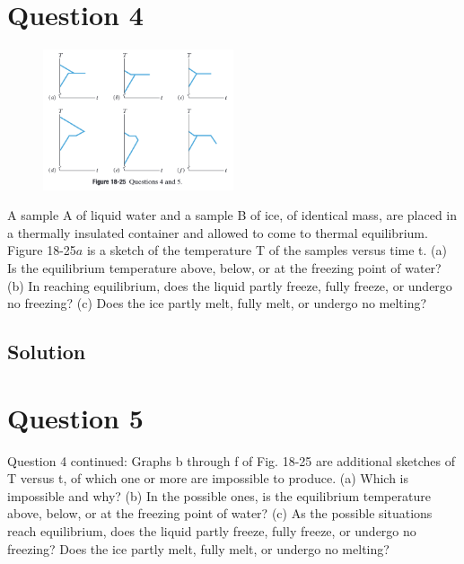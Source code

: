 \documentclass[12pt]{article}
\begin{document}

    \section{Question 4}
        \begin{figure}
            \vspace{-30pt}
            \includegraphics[width=0.5\textwidth]{picture_18-25.png} 
        \end{figure}
        A sample A of liquid water and a sample B of ice, of identical mass, are placed in a thermally insulated container and allowed to come to thermal equilibrium. Figure 18-25$a$ is a sketch of the temperature T of the samples versus time t. (a) Is the equilibrium temperature above, below, or at the freezing point of water? (b) In reaching equilibrium, does the liquid partly freeze, fully freeze, or undergo no freezing? (c) Does the ice partly melt, fully melt, or undergo no melting?

    \subsection{Solution}

    \pagebreak
    \section{Question 5}
        Question 4 continued: Graphs b through f of Fig. 18-25 are additional sketches of T versus t, of which one or more are impossible to produce. (a) Which is impossible and why? (b) In the possible ones, is the equilibrium temperature above, below, or at the freezing point of water? (c) As the possible situations reach equilibrium, does the liquid partly freeze, fully freeze, or undergo no freezing? Does the ice partly melt, fully melt, or undergo no melting?
\end{document}
